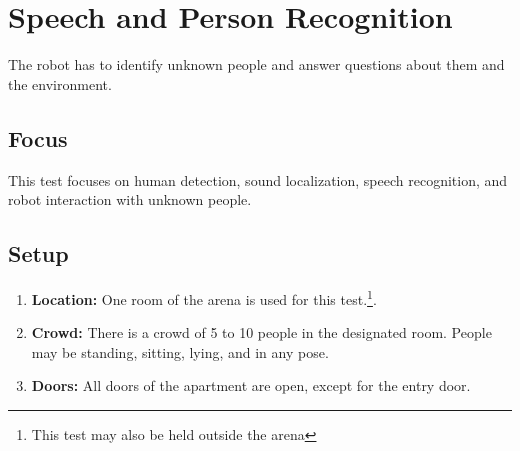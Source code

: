 \section{Speech and Person Recognition}
The robot has to identify unknown people and answer questions about them and the environment.

\subsection{Focus}
This test focuses on human detection, sound localization, speech recognition, and robot interaction with unknown people.

\subsection{Setup}
\begin{enumerate}
    \item \textbf{Location:} One room of the arena is used for this test.\footnote{This test may also be held outside the arena}.
    \item \textbf{Crowd:} There is a crowd of 5 to 10 people in the designated room. People may be standing, sitting, lying, and in any pose.
    \item \textbf{Doors:} All doors of the apartment are open, except for the entry door. 
\end{enumerate}

